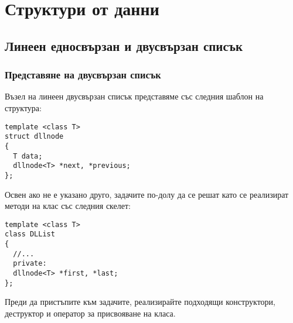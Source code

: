 \chapter{Структури от данни}

\setcounter{section}{15}

\section {Линеен едносвързан и двусвързан списък}

\subsection {Представяне на двусвързан списък}

\begin{mdframed}[hidealllines=true,backgroundcolor=gray!20]
Възел на линеен двусвързан списък представяме със следния шаблон на структура:
\begin{verbatim}
template <class T>
struct dllnode
{
  T data;
  dllnode<T> *next, *previous;
};
\end{verbatim}
Освен ако не е указано друго, задачите по-долу да се решат като се реализират методи на клас  със следния скелет:
\begin{verbatim}
template <class T>
class DLList
{
  //...
  private:
  dllnode<T> *first, *last;
};
\end{verbatim}
Преди да пристъпите към задачите, реализирайте подходящи конструктори, деструктор и оператор за присвояване на класа.
\end{mdframed}

